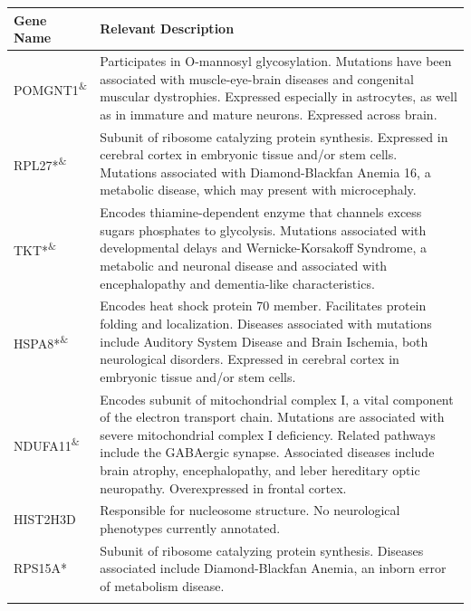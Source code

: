 \documentclass[10pt, oneside]{article}
\begin{document}
\begin{table}[!]
    \centering
{}
\begin{tabular}{p{2cm}p{15cm}}
 \textbf{Gene Name} & \textbf{Relevant Description} \\
 \hline
 POMGNT1\textsuperscript{\&} & Participates in O-mannosyl glycosylation. Mutations have been associated with muscle-eye-brain diseases and congenital muscular dystrophies. Expressed especially in astrocytes, as well as in immature and mature neurons. Expressed across brain. \\
 \hline
 RPL27*\textsuperscript{\&} & Subunit of ribosome catalyzing protein synthesis. Expressed in cerebral cortex in embryonic tissue and/or stem cells. Mutations associated with Diamond-Blackfan Anemia 16, a metabolic disease, which may present with microcephaly. \\
 \hline
 TKT*\textsuperscript{\&} & Encodes thiamine-dependent enzyme that channels excess sugars phosphates to glycolysis. Mutations associated with developmental delays and Wernicke-Korsakoff Syndrome, a metabolic and neuronal disease and associated with encephalopathy and dementia-like characteristics. \\
 \hline
 HSPA8*\textsuperscript{\&} & Encodes heat shock protein 70 member. Facilitates protein folding and localization. Diseases associated with mutations include Auditory System Disease and Brain Ischemia, both neurological disorders. Expressed in cerebral cortex in embryonic tissue and/or stem cells. \\
 \hline
 NDUFA11\textsuperscript{\&} & Encodes subunit of mitochondrial complex I, a vital component of the electron transport chain. Mutations are associated with severe mitochondrial complex I deficiency. Related pathways include the GABAergic synapse. Associated diseases include brain atrophy, encephalopathy, and leber hereditary optic neuropathy. Overexpressed in frontal cortex. \\
 \hline
 HIST2H3D & Responsible for nucleosome structure. No neurological phenotypes currently annotated. \\
 \hline
 RPS15A* & Subunit of ribosome catalyzing protein synthesis. Diseases associated include Diamond-Blackfan Anemia, an inborn error of metabolism disease. \\
 \label{tab:targets}
\end{tabular}
\end{table}
\end{document}
